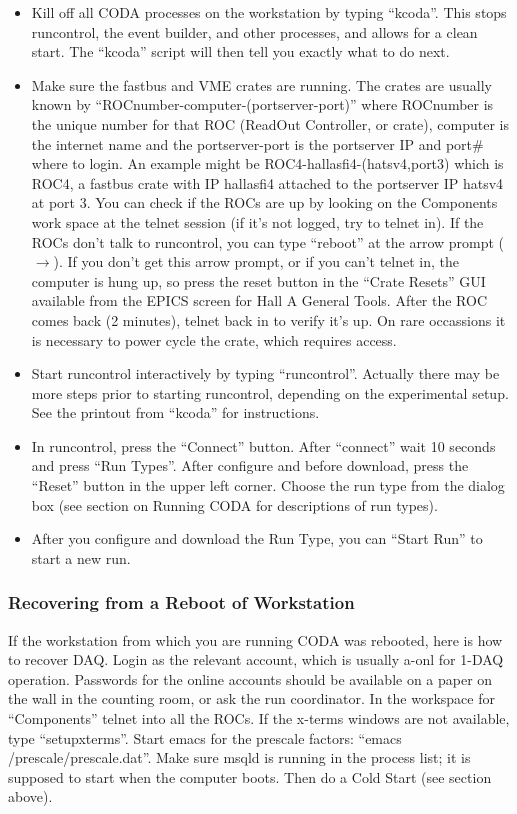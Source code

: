 {\begin{itemize}
\item{Kill off all CODA processes on the workstation
by typing ``kcoda''.  This stops runcontrol, the
event builder, and other processes, and allows
for a clean start.  The ``kcoda'' script will then
tell you exactly what to do next.}
\item{Make sure the fastbus and VME crates are
running.  The crates are usually known by 
``ROCnumber-computer-(portserver-port)''
where ROCnumber is the unique number for that
ROC (ReadOut Controller, or crate),
computer is the internet name and the 
portserver-port is the portserver IP and port\#
where to login.
An example might be \hskip 0.05in
ROC4-hallasfi4-(hatsv4,port3) which is
ROC4, a fastbus crate with IP hallasfi4 attached
to the portserver IP hatsv4 at port 3.
You can check if the ROCs
are up by looking on the Components work space
at the telnet session (if it's not logged, 
try to telnet in).
If the ROCs don't talk to runcontrol, you can type
``reboot'' at the arrow prompt ($\rightarrow$).   If you
don't get this arrow prompt, or if you can't telnet in,
the computer is hung up, so press 
the reset button in the ``Crate Resets'' GUI
available from the EPICS screen for
Hall A General Tools.
After the ROC comes back (2 minutes),
telnet back in to verify it's up.
On rare occassions it is necessary to
power cycle the crate, which requires access. }
\item{ Start runcontrol interactively
by typing ``runcontrol''.
Actually there may be
more steps prior to starting runcontrol,
depending on the experimental setup.
See the printout from ``kcoda'' for instructions.}
\item{ In runcontrol,
press the ``Connect'' button.  
After ``connect''
wait 10 seconds and press ``Run Types''.  
After configure and before download, 
press the ``Reset'' button in the upper left corner.
Choose the run type from the dialog box
(see section on Running
CODA for descriptions of run types).}
\item{ After you configure and download the Run Type,
you can ``Start Run'' to start a new run.}


\end{itemize}


\subsubsection{ Recovering from a Reboot of Workstation}

If the workstation from which you are running CODA
was rebooted, here is how to recover DAQ.
Login as the relevant account, which is usually
a-onl for 1-DAQ operation. Passwords for the online
accounts should be available on a paper on the wall
in the counting room, or ask the run coordinator.
In the workspace for ``Components'' telnet into
all the ROCs.  If the x-terms windows are not 
available, type ``setupxterms''.  Start emacs
for the prescale factors: 
``emacs /prescale/prescale.dat''.
Make sure msqld is running in the process list;
it is supposed to start when the computer boots.
Then do a Cold Start (see section above).

}

